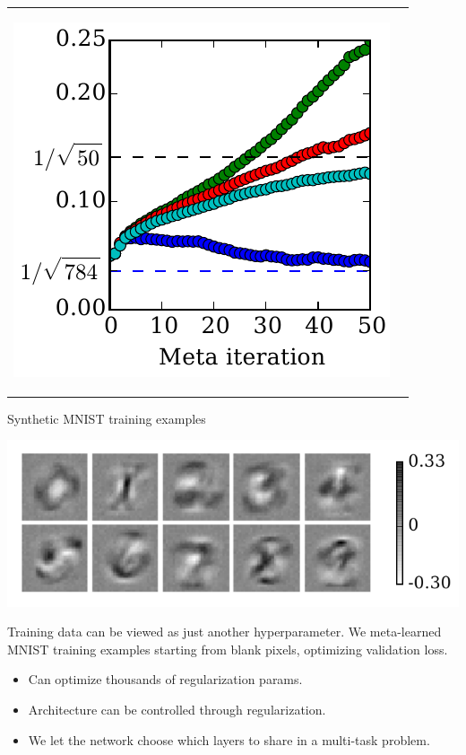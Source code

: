 \documentclass[landscape,a0b,final,a4resizeable]{include/a0poster}
\begin{document}
\begin{poster}
\begin{multicols}{3}
\begin{tabular}{cc}
\begin{minipage}[c]{0.4\columnwidth}
\begin{center}
\hspace{-1em}\includegraphics[width=0.8\columnwidth]{../experiments/Feb_3_training_schedules/3_adam_50/init_weight_learning_curve.pdf}
\end{center}
\end{minipage}
\end{tabular}



\begin{center}
Synthetic MNIST training examples

\includegraphics[width=0.6\columnwidth]{../experiments/Jan_19_optimize_data/9_color_bar/fake_data.pdf}
\end{center}

Training data can be viewed as just another hyperparameter.
We meta-learned MNIST training examples starting from blank pixels, optimizing validation loss.

\vspace{0.5em}


\begin{itemize}
\item Can optimize thousands of regularization params.
\item Architecture can be controlled through regularization.
\item We let the network choose which layers to share in a multi-task problem.
\end{itemize}


\end{multicols}
\end{poster}
\end{document}
